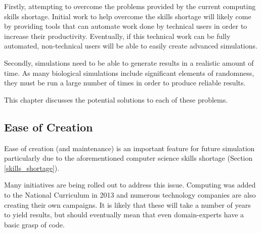 \documentclass{UoYCSproject}
\begin{document}
Firstly, attempting to overcome the problems provided by the current computing skills shortage. 
Initial work to help overcome the skills shortage will likely come by providing tools that can automate work done by technical users in order to increase their productivity.
Eventually, if this technical work can be fully automated, non-technical users will be able to easily create advanced simulations.

Secondly, simulations need to be able to generate results in a realistic amount of time.
As many biological simulations include significant elements of randomness, they must be run a large number of times in order to produce reliable results.

This chapter discusses the potential solutions to each of these problems.

\subsection{Ease of Creation}
Ease of creation (and maintenance) is an important feature for future simulation particularly due to the aforementioned computer science skills shortage (Section \ref{skills_shortage}).



Many initiatives are being rolled out to address this issue.
Computing was added to the National Curriculum in 2013\cite{national_curriculum, teacher_training} and numerous technology companies are also creating their own campaigns\cite{apple_education, microsoft_education}.
It is likely that these will take a number of years to yield results, but should eventually mean that even domain-experts have a basic grasp of code.

\end{document}
